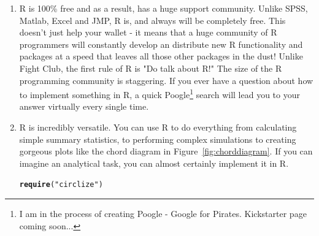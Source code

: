 \documentclass{tufte-book}\usepackage[]{graphicx}\usepackage[]{color}
\makeatletter
\newcommand{\hlstr}[1]{\textcolor[rgb]{0.192,0.494,0.8}{#1}}%
\newcommand{\hlstd}[1]{\textcolor[rgb]{0.345,0.345,0.345}{#1}}%
\newcommand{\hlkwd}[1]{\textcolor[rgb]{0.737,0.353,0.396}{\textbf{#1}}}%
\newenvironment{kframe}{%
 \def\at@end@of@kframe{}%
 \ifinner\ifhmode%
  \def\at@end@of@kframe{\end{minipage}}%
  \begin{minipage}{\columnwidth}%
 \fi\fi%
 \def\FrameCommand##1{\hskip\@totalleftmargin \hskip-\fboxsep
 \colorbox{shadecolor}{##1}\hskip-\fboxsep
     \hskip-\linewidth \hskip-\@totalleftmargin \hskip\columnwidth}%
 \MakeFramed {\advance\hsize-\width
   \@totalleftmargin\z@ \linewidth\hsize
   \@setminipage}}%
 {\par\unskip\endMakeFramed%
 \at@end@of@kframe}
\newenvironment{knitrout}{}{} %
\makeatother
\begin{document}
\begin{enumerate}

\item R is 100\% free and as a result, has a huge support community. Unlike SPSS, Matlab, Excel and JMP, R is, and always will be completely free. This doesn't just help your wallet - it means that a huge community of R programmers will constantly develop an distribute new R functionality and packages at a speed that leaves all those other packages in the dust! Unlike Fight Club, the first rule of R is "Do talk about R!" The size of the R programming community is staggering. If you ever have a question about how to implement something in R, a quick Poogle\footnote{I am in the process of creating Poogle - Google for Pirates. Kickstarter page coming soon...} search will lead you to your answer virtually every single time.

\item R is incredibly versatile. You can use R to do everything from calculating simple summary statistics, to performing complex simulations to creating gorgeous plots like the chord diagram in Figure~\ref{fig:chorddiagram}. If you can imagine an analytical task, you can almost certainly implement it in R.

\begin{marginfigure}
\begin{tiny}
\begin{knitrout}
\color{fgcolor}\begin{kframe}
\begin{alltt}
\hlkwd{require}\hlstd{(}\hlstr{"circlize"}\hlstd{)}
\end{alltt}



\end{kframe}
\end{knitrout}
\end{tiny}
\end{marginfigure}
\end{enumerate}
\end{document}
